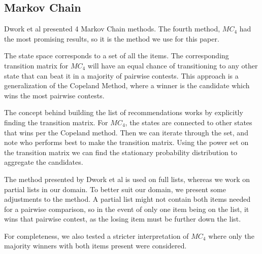 \subsection{Markov Chain}\label{sec:markovchain}

Dwork et al presented 4 Markov Chain methods. The fourth method, $MC_{4}$ had the most promising results, so it is the method we use for this paper.

The state space corresponds to a set of all the items. The corresponding transition matrix for $MC_4$ will have an equal chance of transitioning to any other state that can beat it in a majority of pairwise contests. This approach is a generalization of the Copeland Method, where a winner is the candidate which wins the most pairwise contests.

The concept behind building the list of recommendations works by explicitly finding the transition matrix. For $MC_4$, the states are connected to other states that wins per the Copeland method. Then we can iterate through the set, and note who performs best to make the transition matrix. Using the power set on the transition matrix we can find the stationary probability distribution to aggregate the candidates.

The method presented by Dwork et al is used on full lists, whereas we work on partial lists in our domain. To better suit our domain, we present some adjustments to the method. A partial list might not contain both items needed for a pairwise comparison, so in the event of only one item being on the list, it wins that pairwise contest, as the losing item must be further down the list.

For completeness, we also tested a stricter interpretation of $MC_4$ where only the majority winners with both items present were considered.
\cite{rank:aggregation}
\cite{dwork2001rank}